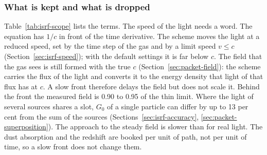 \subsubsection{What is kept and what is dropped}
\label{sec:isrf-rte-scope}

Table~\ref{tab:isrf-scope} lists the terms. The speed of the light needs a
word. The equation has $1/c$ in front of the time derivative. The scheme moves
the light at a reduced speed, set by the time step of the gas and by a limit
speed $v\le c$ (Section~\ref{sec:isrf-speed}); with the default settings it is
far below $c$. The field that the gas sees is still formed with the true $c$
(Section~\ref{sec:packet-field}): the scheme carries the flux of the light and
converts it to the energy density that light of that flux has at $c$. A slow
front therefore delays the field but does not scale it. Behind the front the
measured field is 0.90 to 0.95 of the thin limit. Where the light of several
sources shares a slot, $G_0$ of a single particle can differ by up to 13 per
cent from the sum of the sources
(Sections~\ref{sec:isrf-accuracy}, \ref{sec:packet-superposition}). The
approach to the steady field is slower than for real light. The dust
absorption and the redshift are booked per unit of path, not per unit of
time, so a slow front does not change them.

